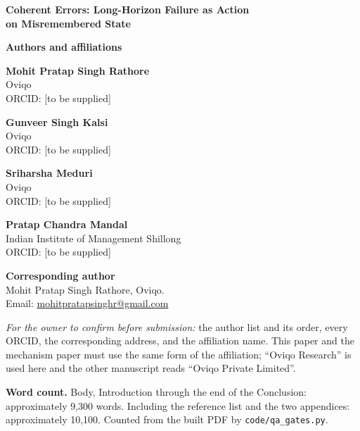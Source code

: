 \documentclass[11pt]{article}
\begin{document}
\begin{center}
{\LARGE\bfseries Coherent Errors: Long-Horizon Failure as Action\\[2mm]
on Misremembered State}
\end{center}

\vspace{8mm}

\noindent\textbf{Authors and affiliations}

\vspace{3mm}

\noindent\textbf{Mohit Pratap Singh Rathore}\\
Oviqo\\
ORCID: [to be supplied]

\vspace{3mm}

\noindent\textbf{Gunveer Singh Kalsi}\\
Oviqo\\
ORCID: [to be supplied]

\vspace{3mm}

\noindent\textbf{Sriharsha Meduri}\\
Oviqo\\
ORCID: [to be supplied]

\vspace{3mm}

\noindent\textbf{Pratap Chandra Mandal}\\
Indian Institute of Management Shillong\\
ORCID: [to be supplied]

\vspace{6mm}

\noindent\textbf{Corresponding author}\\
Mohit Pratap Singh Rathore, Oviqo.\\
Email: \href{mailto:mohitpratapsinghr@gmail.com}{mohitpratapsinghr@gmail.com}

\vspace{3mm}

\noindent\textit{For the owner to confirm before submission:} the author list and
its order, every ORCID, the corresponding address, and the affiliation name. This
paper and the mechanism paper must use the same form of the affiliation; ``Oviqo
Research'' is used here and the other manuscript reads ``Oviqo Private Limited''.

\vspace{6mm}

\noindent\textbf{Word count.} Body, Introduction through the end of the
Conclusion: approximately 9,300 words. Including the reference list and the two
appendices: approximately 10,100. Counted from the built PDF by
\texttt{code/qa\_gates.py}.
\end{document}
